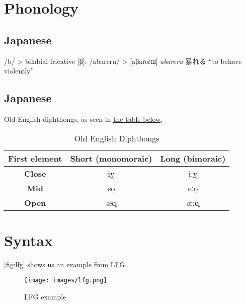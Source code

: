 \documentclass[a4paper,12pt,twoside]{article}
\begin{document}
\section{Phonology}\label{sec:phonology}
\subsection{Japanese}\label{ssec:phonology-japanese}

/b/ > bilabial fricative [β]: /abareru/ > [aβaɾeɾɯ] \textit{abareru} 暴れる ``to behave violently''


\subsection{Japanese}\label{ssec:phonology-oldenglish}


Old English diphthongs, as seen in \hyperref[tab:oe-diphthongs]{the table below}.

\begin{table}
  \caption{Old English Diphthongs}
  \label{tab:oe-diphthongs}
  \centering
  \begin{tabular}{ccc}
    \toprule
    \textbf{First element} & \textbf{Short (monomoraic)} & \textbf{Long (bimoraic)} \\
    \midrule
    \textbf{Close} & iy̯ & iːy̯ \\
    \textbf{Mid} & eo̯ & eːo̯ \\
    \textbf{Open} & æɑ̯ & æːɑ̯ \\
    \bottomrule
  \end{tabular}
\end{table}


\section{Syntax}\label{sec:syntax}

\autoref{fig:lfg} shows us an example from LFG.

\begin{figure}
  \caption{LFG example}
  \label{fig:lfg}
  \texttt{[image: images/lfg.png]}
\end{figure}
\end{document}
